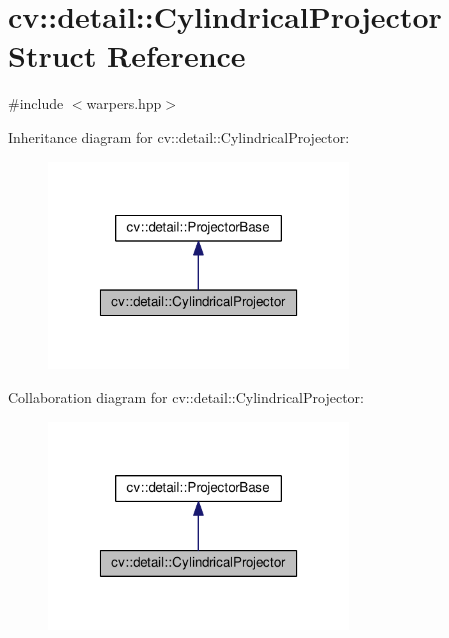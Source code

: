 \hypertarget{structcv_1_1detail_1_1CylindricalProjector}{\section{cv\-:\-:detail\-:\-:Cylindrical\-Projector Struct Reference}
\label{structcv_1_1detail_1_1CylindricalProjector}
}


{\ttfamily \#include $<$warpers.\-hpp$>$}



Inheritance diagram for cv\-:\-:detail\-:\-:Cylindrical\-Projector\-:\nopagebreak
\begin{figure}[H]
\begin{center}
\leavevmode
\includegraphics[width=226pt]{structcv_1_1detail_1_1CylindricalProjector__inherit__graph}
\end{center}
\end{figure}


Collaboration diagram for cv\-:\-:detail\-:\-:Cylindrical\-Projector\-:\nopagebreak
\begin{figure}[H]
\begin{center}
\leavevmode
\includegraphics[width=226pt]{structcv_1_1detail_1_1CylindricalProjector__coll__graph}
\end{center}
\end{figure}
